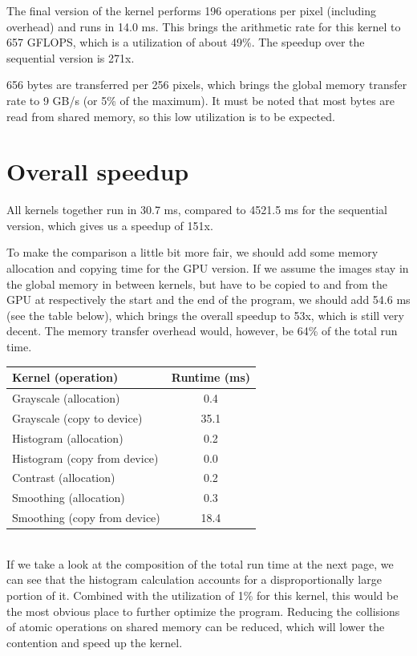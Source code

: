 \documentclass[11pt,a4paper]{article}
\begin{document}
The final version of the kernel performs 196 operations per pixel (including overhead) and runs in 14.0 ms. This brings the arithmetic rate for this kernel to 657 GFLOPS, which is a utilization of about 49\%. The speedup over the sequential version is 271x.

656 bytes are transferred per 256 pixels, which brings the global memory transfer rate to 9 GB/s (or 5\% of the maximum). It must be noted that most bytes are read from shared memory, so this low utilization is to be expected.

\section{Overall speedup}
All kernels together run in 30.7 ms, compared to 4521.5 ms for the sequential version, which gives us a speedup of 151x.

To make the comparison a little bit more fair, we should add some memory allocation and copying time for the GPU version. If we assume the images stay in the global memory in between kernels, but have to be copied to and from the GPU at respectively the start and the end of the program, we should add 54.6 ms (see the table below), which brings the overall speedup to 53x, which is still very decent. The memory transfer overhead would, however, be 64\% of the total run time. \\

\begin{tabular}{ | l | S | }
	\hline
	\textbf{Kernel (operation)} & \textbf{Runtime (ms)} \\
	\hline
	Grayscale (allocation) & 0.4 \\
	\hline
	Grayscale (copy to device) & 35.1 \\
	\hline
	Histogram (allocation) & 0.2 \\
	\hline
	Histogram (copy from device) & 0.0 \\
	\hline
	Contrast (allocation) & 0.2 \\
	\hline
	Smoothing (allocation) & 0.3 \\
	\hline
	Smoothing (copy from device) & 18.4 \\
	\hline
\end{tabular} \\

If we take a look at the composition of the total run time at the next page, we can see that the histogram calculation accounts for a disproportionally large portion of it. Combined with the utilization of 1\% for this kernel, this would be the most obvious place to further optimize the program. Reducing the collisions of atomic operations on shared memory can be reduced, which will lower the contention and speed up the kernel.
\end{document}
